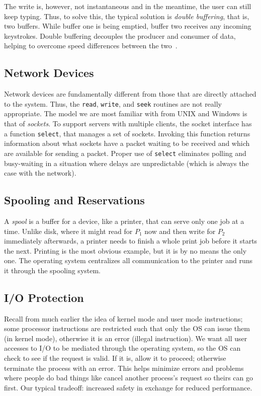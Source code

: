 The write is, however, not instantaneous and in the meantime, the user can still keep typing. Thus, to solve this, the typical solution is \textit{double buffering}, that is, two buffers. While buffer one is being emptied, buffer two receives any incoming keystrokes. Double buffering decouples the producer and consumer of data, helping to overcome speed differences between the two~\cite{osc}.


\subsection*{Network Devices}

Network devices are fundamentally different from those that are directly attached to the system. Thus, the \texttt{read}, \texttt{write}, and \texttt{seek} routines are not really appropriate. The model we are most familiar with from UNIX and Windows is that of \textit{sockets}.
To support servers with multiple clients, the socket interface has a function \texttt{select}, that manages a set of sockets. Invoking this function returns information about what sockets have a packet waiting to be received and which are available for sending a packet. Proper use of \texttt{select} eliminates polling and busy-waiting in a situation where delays are unpredictable (which is always the case with the network).


\subsection*{Spooling and Reservations}
A \textit{spool} is a buffer for a device, like a printer, that can serve only one job at a time. Unlike disk, where it might read for $P_{1}$ now and then write for $P_{2}$ immediately afterwards, a printer needs to finish a whole print job before it starts the next. Printing is the most obvious example, but it is by no means the only one. The operating system centralizes all communication to the printer and runs it through the spooling system. 

\subsection*{I/O Protection}
Recall from much earlier the idea of kernel mode and user mode instructions; some processor instructions are restricted such that only the OS can issue them (in kernel mode), otherwise it is an error (illegal instruction). We want all user accesses to I/O to be mediated through the operating system, so the OS can check to see if the request is valid. If it is, allow it to proceed; otherwise terminate the process with an error. This helps minimize errors and problems where people do bad things like cancel another process's request so theirs can go first. Our typical tradeoff: increased safety in exchange for reduced performance.

